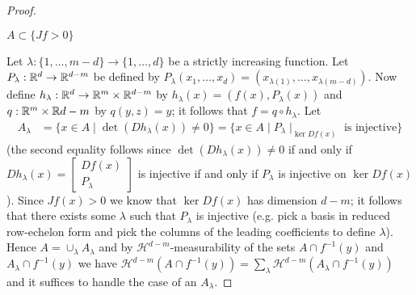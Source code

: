\begin{proof}
\begin{cas} $A \subset \lbrace Jf > 0 \rbrace$
\end{cas}
Let $\lambda : \lbrace 1, \dotsc, m-d \rbrace \to \lbrace 1, \dotsc, d \rbrace$ be a strictly increasing function.  Let $P_\lambda : \mathbb{R}^d \to \mathbb{R}^{d-m}$ be defined by
$P_\lambda(x_1, \dotsc, x_d) = (x_{\lambda(1)}, \dotsc, x_{\lambda(m-d)})$.  Now define $h_\lambda : \mathbb{R}^d \to \mathbb{R}^m \times \mathbb{R}^{d-m}$ by $h_\lambda(x) = (f(x), P_\lambda(x))$ and
$q : \mathbb{R}^{m} \times \mathbb{R}{d-m}$ by $q(y,z) = y$; it follows that $f = q \circ h_\lambda$.  Let
\begin{align*}
A_\lambda &= \lbrace x \in A \mid \det(Dh_\lambda(x)) \neq 0 \rbrace = \lbrace x \in A \mid P_\lambda \mid_{\ker Df(x)} \text{ is injective} \rbrace
\end{align*}
(the second equality follows since $\det(Dh_\lambda(x)) \neq 0$ if and only if $Dh_\lambda(x) = \begin{bmatrix} Df(x) \\ P_\lambda \end{bmatrix}$ is injective if and only if $P_\lambda$ is injective on $\ker Df(x)$).  Since $Jf(x) > 0$ we know that $\ker Df(x)$ has dimension $d-m$; it follows that there exists some $\lambda$ such that $P_\lambda$ is injective (e.g. pick a basis in reduced row-echelon form and pick the columns of the leading coefficients to define $\lambda$).  Hence $A = \cup_{\lambda} A_\lambda$ and by $\mathcal{H}^{d-m}$-measurability of the 
sets $A \cap f^{-1}(y)$ and $A_\lambda \cap f^{-1}(y)$ we have $\mathcal{H}^{d-m}(A \cap f^{-1}(y)) = \sum_\lambda \mathcal{H}^{d-m}(A_\lambda \cap f^{-1}(y))$ and it suffices to 
handle the case of an $A_\lambda$.


\end{proof}
